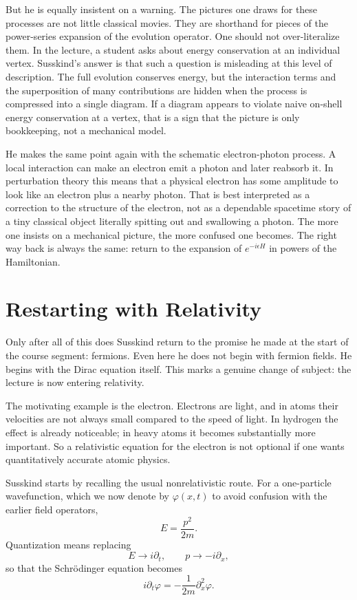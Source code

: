 But he is equally insistent on a warning. The pictures one draws for these processes are not little classical movies. They are shorthand for pieces of the power-series expansion of the evolution operator. One should not over-literalize them. In the lecture, a student asks about energy conservation at an individual vertex. Susskind's answer is that such a question is misleading at this level of description. The full evolution conserves energy, but the interaction terms and the superposition of many contributions are hidden when the process is compressed into a single diagram. If a diagram appears to violate naive on-shell energy conservation at a vertex, that is a sign that the picture is only bookkeeping, not a mechanical model.

He makes the same point again with the schematic electron-photon process. A local interaction can make an electron emit a photon and later reabsorb it. In perturbation theory this means that a physical electron has some amplitude to look like an electron plus a nearby photon. That is best interpreted as a correction to the structure of the electron, not as a dependable spacetime story of a tiny classical object literally spitting out and swallowing a photon. The more one insists on a mechanical picture, the more confused one becomes. The right way back is always the same: return to the expansion of \(e^{-i\epsilon H}\) in powers of the Hamiltonian.

\section{Restarting with Relativity}

Only after all of this does Susskind return to the promise he made at the start of the course segment: fermions. Even here he does not begin with fermion fields. He begins with the Dirac equation itself. This marks a genuine change of subject: the lecture is now entering relativity.

The motivating example is the electron. Electrons are light, and in atoms their velocities are not always small compared to the speed of light. In hydrogen the effect is already noticeable; in heavy atoms it becomes substantially more important. So a relativistic equation for the electron is not optional if one wants quantitatively accurate atomic physics.

Susskind starts by recalling the usual nonrelativistic route. For a one-particle wavefunction, which we now denote by \(\varphi(x,t)\) to avoid confusion with the earlier field operators,
\begin{equation}
E=\frac{p^2}{2m}.
\end{equation}
Quantization means replacing
\begin{equation}
E\to i\partial_t,
\qquad
p\to -i\partial_x,
\end{equation}
so that the Schr\"odinger equation becomes
\begin{equation}
i\partial_t\varphi=-\frac{1}{2m}\partial_x^2\varphi.
\end{equation}

